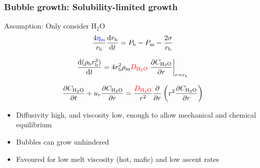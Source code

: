 \documentclass{beamer}
\begin{document}
\begin{frame}
  \frametitle{Bubble growth: Solubility-limited growth}

  Assumption: Only consider H$_{2}$O \\
  
  $$ \frac{4 \textcolor{blue}{\eta_{\text{m}}}}{r_{\text{b}}} \frac{\mathrm{d} r_{\text{b}}}{\mathrm{d} t} = P_{\text{b}} - P_{\text{m}} - \frac{2 \sigma}{r_{\text{b}}} $$

  $$ \frac{\mathrm{d} (\rho_{\text{b}} r_{\text{b}}^{3})}{\mathrm{d} t} = 4 r_{\text{b}}^{2} \rho_{\text{m}} \textcolor{red}{D_{\text{H}_{2}\text{O}}} \left. \frac{\partial C_{\text{H}_{2}\text{O}}}{\partial r}\right|_{r = r_{\text{b}}}$$

  $$ \frac{\partial C_{\text{H}_{2}\text{O}}}{\partial t} + u_{r} \frac{\partial C_{\text{H}_{2}\text{O}}}{\partial r} = \frac{\textcolor{red}{D_{\text{H}_{2}\text{O}}}}{r^{2}} \frac{\partial}{\partial r} \left( r^{2} \frac{\partial C_{\text{H}_{2}\text{O}}}{\partial r}\right)$$

  \begin{itemize}
  \item Diffusivity high, and viscosity low, enough to allow mechanical and chemical equilibrium \\
  \item Bubbles can grow unhindered \\
  \item Favoured for low melt viscosity (hot, mafic) and low ascent rates \\
  \end{itemize}
    
\end{frame}
\end{document}

